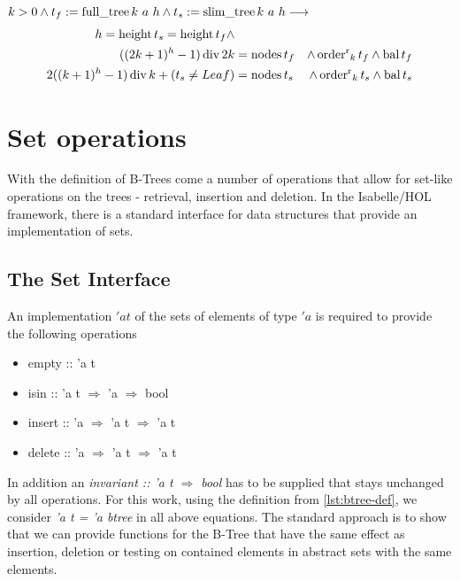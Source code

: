 \begin{theorem}
    $k > 0 \wedge t_f := \operatorname{full\_tree} k\ a\ h \wedge t_s := \operatorname{slim\_tree} k\ a\ h \longrightarrow$
    \begin{align}
    h = \operatorname{height} t_s = \operatorname{height} t_f \wedge \\
        ((2k+1)^h - 1) \operatorname{div} 2k &= \operatorname{nodes} t_f &\wedge \operatorname{order^r}_k t_f \wedge \operatorname{bal} t_f \\ 
        2((k+1)^h - 1) \operatorname{div} k + (t_s \neq Leaf) &= \operatorname{nodes} t_s &\wedge \operatorname{order^r}_k t_s \wedge \operatorname{bal} t_s
    \end{align}
\end{theorem}


\section{Set operations}

With the definition of B-Trees come a number of operations that allow for set-like operations
on the trees - retrieval, insertion and deletion.
In the Isabelle/HOL framework, there is a standard interface
for data structures that provide an implementation of sets.

\subsection{The Set Interface}

An implementation $'a t$ of the sets of elements of type $'a$ is required to provide the following
operations

\begin{itemize}
    \itshape
    \item empty :: 'a t
    \item isin :: 'a t $\Rightarrow$ 'a $\Rightarrow$ bool
    \item insert :: 'a $\Rightarrow$ 'a t $\Rightarrow$ 'a t
    \item delete :: 'a $\Rightarrow$ 'a t $\Rightarrow$ 'a t
\end{itemize}

In addition an \textit{invariant :: 'a t $\Rightarrow$ bool} has to be supplied
that stays unchanged by all operations.
For this work, using the definition from \autoref{lst:btree-def},
we consider \textit{'a t = 'a btree} in all above equations.
The standard approach is to show that we can provide functions for the B-Tree
that have the same effect as insertion, deletion or testing on contained elements
in abstract sets with the same elements.

